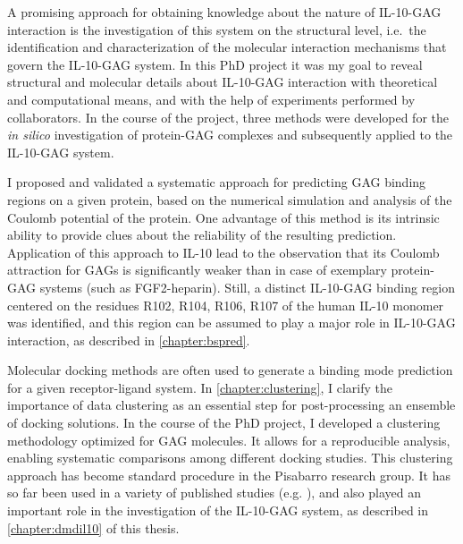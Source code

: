 A promising approach for obtaining knowledge about the nature of IL-10-GAG
interaction is the investigation of this system on the structural level, i.e.\
the identification and characterization of the molecular interaction mechanisms
that govern the IL-10-GAG system. In this PhD project it was my goal to reveal
structural and molecular details about IL-10-GAG interaction with theoretical
and computational means, and with the help of experiments performed by
collaborators. In the course of the project, three methods were developed for
the \textit{in silico} investigation of protein-GAG complexes and subsequently
applied to the IL-10-GAG system.

I proposed and validated a systematic approach for predicting GAG binding
regions on a given protein, based on the numerical simulation and analysis of
the Coulomb potential of the protein. One advantage of this method is its
intrinsic ability to provide clues about the reliability of the resulting
prediction. Application of this approach to IL-10 lead to the observation that
its Coulomb attraction for GAGs is significantly weaker than in case of
exemplary protein-GAG systems (such as FGF2-heparin). Still, a distinct
IL-10-GAG binding region centered on the residues R102, R104, R106, R107 of the
human IL-10 monomer was identified, and this region can be assumed to play a
major role in IL-10-GAG interaction, as described in \cref{chapter:bspred}.

Molecular docking methods are often used to generate a binding mode prediction
for a given receptor-ligand system. In \cref{chapter:clustering}, I clarify the
importance of data clustering as an essential step for post-processing an
ensemble of docking solutions. In the course of the PhD project, I developed a
clustering methodology optimized for GAG molecules. It allows for a reproducible
analysis, enabling systematic comparisons among different docking studies. This
clustering approach has become standard procedure in the Pisabarro research
group. It has so far been used in a variety of published studies (e.g.
\cite{franz_cathepsin_2013}), and also played an important role in the
investigation of the IL-10-GAG system, as described in \cref{chapter:dmdil10} of
this thesis.

